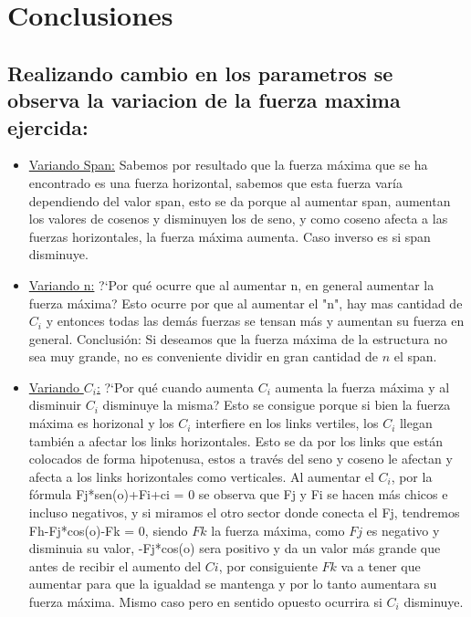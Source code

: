 \section{Conclusiones}

\subsection{Realizando cambio en los parametros se observa la variacion de la fuerza maxima ejercida:}

\begin{itemize}

\item \underline{Variando Span:} Sabemos por resultado que la fuerza m\'axima que se ha encontrado es una fuerza horizontal, sabemos que esta fuerza var\'ia dependiendo del valor span, esto se da porque al aumentar span, aumentan los valores de cosenos y disminuyen los de seno, y como coseno afecta a las fuerzas horizontales, la fuerza m\'axima aumenta. Caso inverso es si span disminuye.

\item \underline{Variando n:} ?`Por qu\'e ocurre que al aumentar n, en general aumentar la fuerza m\'axima?
Esto ocurre por que al aumentar el "n", hay mas cantidad de $C_i$ y entonces todas las dem\'as fuerzas se tensan m\'as y aumentan su fuerza en general.
Conclusi\'on: Si deseamos que la fuerza m\'axima de la estructura no sea muy grande, no es conveniente dividir en gran cantidad de $n$ el span. 

\item \underline{Variando $C_i$:} ?`Por qu\'e cuando aumenta $C_i$ aumenta la fuerza m\'axima y al disminuir $C_i$ disminuye la misma?
Esto se consigue porque si bien la fuerza m\'axima es horizonal y los $C_i$ interfiere en los links vertiles, los $C_i$ llegan tambi\'en a afectar los links horizontales. Esto se da por los links que est\'an colocados de forma hipotenusa, estos a trav\'es del seno y coseno le afectan y afecta a los links horizontales como verticales. Al aumentar el $C_i$, por la f\'ormula Fj*sen(o)+Fi+ci = 0 se observa que Fj y Fi se hacen m\'as chicos e incluso negativos, y si miramos el otro sector donde conecta el Fj, tendremos Fh-Fj*cos(o)-Fk = 0, siendo $Fk$ la fuerza m\'axima, como $Fj$ es negativo y disminuia su valor, -Fj*cos(o) sera positivo y da un valor m\'as grande que antes de recibir el aumento del $Ci$, por consiguiente $Fk$ va a tener que aumentar para que la igualdad se mantenga y por lo tanto aumentara su fuerza m\'axima.\newline
Mismo caso pero en sentido opuesto ocurrira si $C_i$ disminuye.


\end{itemize}

